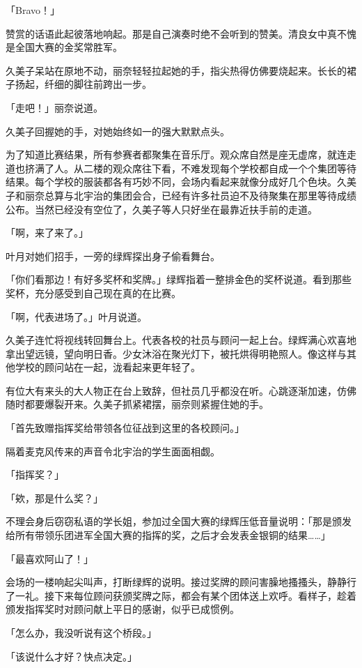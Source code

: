 \documentclass[UTF8]{ctexart}
\begin{document}
    「Bravo！」 

    赞赏的话语此起彼落地响起。那是自己演奏时绝不会听到的赞美。清良女中真不愧是全国大赛的金奖常胜军。 

    久美子呆站在原地不动，丽奈轻轻拉起她的手，指尖热得仿佛要烧起来。长长的裙子扬起，纤细的脚往前跨出一步。 

    「走吧！」丽奈说道。 

    久美子回握她的手，对她始终如一的强大默默点头。 

    为了知道比赛结果，所有参赛者都聚集在音乐厅。观众席自然是座无虚席，就连走道也挤满了人。从二楼的观众席往下看，不难发现每个学校都自成一个个集团等待结果。每个学校的服装都各有巧妙不同，会场内看起来就像分成好几个色块。久美子和丽奈总算与北宇治的集团会合，已经有许多社员迫不及待聚集在那里等待成绩公布。当然已经没有空位了，久美子等人只好坐在最靠近扶手前的走道。 

    「啊，来了来了。」 

    叶月对她们招手，一旁的绿辉探出身子偷看舞台。 

    「你们看那边！有好多奖杯和奖牌。」绿辉指着一整排金色的奖杯说道。看到那些奖杯，充分感受到自己现在真的在比赛。 

    「啊，代表进场了。」叶月说道。 

    久美子连忙将视线转回舞台上。代表各校的社员与顾问一起上台。绿辉满心欢喜地拿出望远镜，望向明日香。少女沐浴在聚光灯下，被托烘得明艳照人。像这样与其他学校的顾问站在一起，泷看起来更年轻了。 

    有位大有来头的大人物正在台上致辞，但社员几乎都没在听。心跳逐渐加速，仿佛随时都要爆裂开来。久美子抓紧裙摆，丽奈则紧握住她的手。 

    「首先致赠指挥奖给带领各位征战到这里的各校顾问。」 

    隔着麦克风传来的声音令北宇治的学生面面相觑。 

    「指挥奖？」 

    「欸，那是什么奖？」 

    不理会身后窃窃私语的学长姐，参加过全国大赛的绿辉压低音量说明：「那是颁发给所有带领乐团进军全国大赛的指挥的奖，之后才会发表金银铜的结果……」 

    「最喜欢阿山了！」 

    会场的一楼响起尖叫声，打断绿辉的说明。接过奖牌的顾问害臊地搔搔头，静静行了一礼。接下来每位顾问获颁奖牌之际，都会有某个团体送上欢呼。看样子，趁着颁发指挥奖时对顾问献上平日的感谢，似乎已成惯例。 

    「怎么办，我没听说有这个桥段。」 

    「该说什么才好？快点决定。」 
\end{document}
